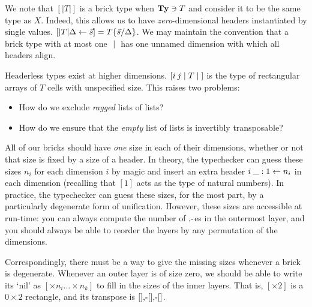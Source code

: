 \documentclass{article}
\begin{document}
We note that $[|T|]$ is a brick type when $\mathbf{Ty}\ni T$ and consider it to be the same type as $X$. Indeed, this allows us to have \emph{zero}-dimensional headers instantiated by single values. $[|T|\Delta\leftarrow\vec s] = T\{\vec s/\Delta\}$. We may maintain the convention that a brick type with at most one $\;|\;$ has one unnamed dimension with which all headers align.

Headerless types exist at higher dimensions. $[i\: j\;|\; T \;|\;]$ is the type of rectangular arrays of $T$ cells with unspecified size. This raises two problems:
\begin{itemize}
\item How do we exclude \emph{ragged} lists of lists?
\item How do we ensure that the \emph{empty} list of lists is invertibly transposable?
\end{itemize}

All of our bricks should have \emph{one} size in each of their dimensions, whether or not that size is fixed by a size of a header. In theory, the typechecker can guess these sizes $n_i$ for each dimension $i$ by magic and insert an extra header $i\:\_:1\leftarrow n_i$ in each dimension (recalling that $[1]$ acts as the type of natural numbers). In practice, the typechecker can guess these sizes, for the most part, by a particularly degenerate form of unification. However, these sizes are accessible at run-time: you can always compute the number of $\mbox{$,\!\textrm{-}$}$es in the outermost layer, and you should always be able to reorder the layers by any permutation of the dimensions.

Correspondingly, there must be a way to give the missing sizes whenever a brick is degenerate. Whenever an outer layer is of size zero, we should be able to write its `nil' as $[\times n_i\ldots\times n_k]$ to fill in the sizes of the inner layers. That is, $[\times 2]$ is a $0\times 2$ rectangle, and its transpose is $[]\mbox{$,\!\textrm{-}$}[]\mbox{$,\!\textrm{-}$}[]$.
\end{document}
